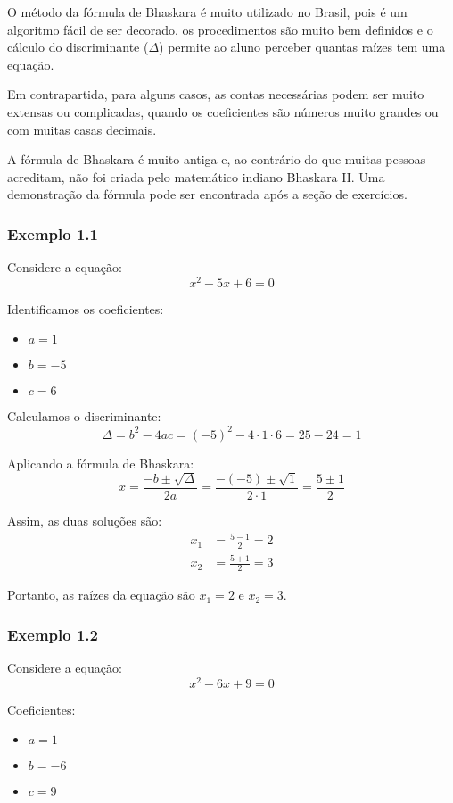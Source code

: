 \documentclass[12pt]{report}
\newcommand{\1}{\faThermometerEmpty}
\newcommand{\2}{\faThermometerQuarter}
\newcommand{\3}{\faThermometerHalf}
\newcommand{\4}{\faThermometerThreeQuarters}
\newcommand{\5}{\faThermometerFull}
\begin{document}
O método da fórmula de Bhaskara é muito utilizado no Brasil, pois é um algoritmo fácil de ser decorado, os procedimentos são muito bem definidos e o cálculo do discriminante ($\Delta$) permite ao aluno perceber quantas raízes tem uma equação.

Em contrapartida, para alguns casos, as contas necessárias podem ser muito extensas ou complicadas, quando os coeficientes são números muito grandes ou com muitas casas decimais.

A fórmula de Bhaskara é muito antiga e, ao contrário do que muitas pessoas acreditam, não foi criada pelo matemático indiano Bhaskara II. Uma demonstração da fórmula pode ser encontrada após a seção de exercícios.



\subsubsection*{Exemplo 1.1}

Considere a equação:
$$ x^2 - 5x + 6 = 0 $$

Identificamos os coeficientes:
\begin{itemize}
    \item $a = 1$
    \item $b = -5$
    \item $c = 6$
\end{itemize}

Calculamos o discriminante:
$$ \Delta = b^2 - 4ac = (-5)^2 - 4 \cdot 1 \cdot 6 = 25 - 24 = 1 $$

Aplicando a fórmula de Bhaskara:
$$
x = \frac{-b \pm \sqrt{\Delta}}{2a} = \frac{-(-5) \pm \sqrt{1}}{2 \cdot 1} = \frac{5 \pm 1}{2}
$$

Assim, as duas soluções são:
\[
\begin{aligned}
    x_1 &= \frac{5 - 1}{2} = 2 \\
    x_2 &= \frac{5 + 1}{2} = 3
\end{aligned}
\]

Portanto, as raízes da equação são $x_1 = 2$ e $x_2 = 3$.



\subsubsection*{Exemplo 1.2}
Considere a equação:
$$ x^2 - 6x + 9 = 0 $$

Coeficientes:
\begin{itemize}
    \item $a = 1$
    \item $b = -6$
    \item $c = 9$
\end{itemize}
\end{document}
